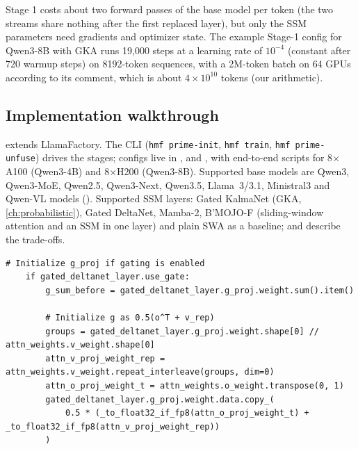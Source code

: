 Stage 1 costs about two forward passes of the base model per token (the two streams share
nothing after the first replaced layer), but only the SSM parameters need gradients and optimizer
state. The example Stage-1 config for Qwen3-8B with GKA runs 19,000 steps at a learning rate of
$10^{-4}$ (constant after 720 warmup steps) on 8192-token sequences, with a 2M-token batch on 64
GPUs according to its comment, which is about $4\times10^{10}$ tokens (our arithmetic).

\subsection{Implementation walkthrough}

\begin{implnote}[title={In the code: the toolkit}]
 extends LlamaFactory. The CLI (\texttt{hmf prime-init},
\texttt{hmf train}, \texttt{hmf prime-unfuse}) drives the stages; configs live in
,  and , with end-to-end
scripts for 8$\times$A100 (Qwen3-4B) and 8$\times$H200 (Qwen3-8B). Supported base models are
Qwen3, Qwen3-MoE, Qwen2.5, Qwen3-Next, Qwen3.5, Llama~3/3.1, Ministral3 and Qwen-VL models
(). Supported SSM layers: Gated KalmaNet (GKA, \cref{ch:probabilistic}),
Gated DeltaNet, Mamba-2, B'MOJO-F (sliding-window attention and an SSM in one layer) and plain SWA
as a baseline;  and  describe the trade-offs.
\end{implnote}

\begin{lstlisting}[caption={Excerpt from \texttt{repos/\allowbreak awslabs\_\_hybrid-model-factory/\allowbreak training/\allowbreak src/\allowbreak hmf/\allowbreak priming/\allowbreak hybrid\_layer\_init.py} (\texttt{gated\_deltanet\_proj\_init}, gate initialization).},label={lst:c12-prime-gate}]
    # Initialize g_proj if gating is enabled
    if gated_deltanet_layer.use_gate:
        g_sum_before = gated_deltanet_layer.g_proj.weight.sum().item()

        # Initialize g as 0.5(o^T + v_rep)
        groups = gated_deltanet_layer.g_proj.weight.shape[0] // attn_weights.v_weight.shape[0]
        attn_v_proj_weight_rep = attn_weights.v_weight.repeat_interleave(groups, dim=0)
        attn_o_proj_weight_t = attn_weights.o_weight.transpose(0, 1)
        gated_deltanet_layer.g_proj.weight.data.copy_(
            0.5 * (_to_float32_if_fp8(attn_o_proj_weight_t) + _to_float32_if_fp8(attn_v_proj_weight_rep))
        )
\end{lstlisting}

